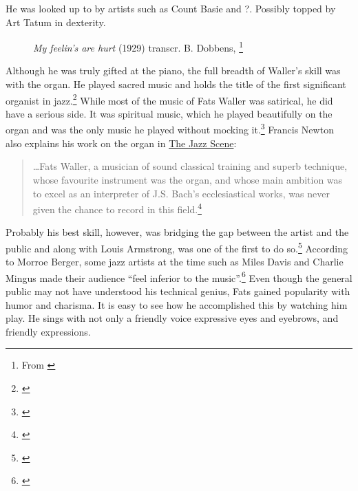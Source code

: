 \documentclass[11pt]{report}
\begin{document}
	
	
	
	He was looked up to by artists such as Count Basie and ?.
	Possibly topped by Art Tatum in dexterity.



	\begin{figure}[ht]
		\centering
		\begin{minipage}{\textwidth}

			{%
\parindent 0pt
\ifx\preLilyPondExample \undefined
\else
  \expandafter\preLilyPondExample
\fi
\def\lilypondbook{}%

\ifx\postLilyPondExample \undefined
\else
  \expandafter\postLilyPondExample
\fi
}


		\caption{\emph{My feelin's are hurt} (1929) transcr. B. Dobbens,  \protect\footnote{\scriptsize From \cite[]{grove-book:waller}}}
		\label{fig:hurt}
		
		\end{minipage}
	\end{figure}


	\label{sec:oregon}
	Although he was truly gifted at the piano, the full breadth of Waller's skill was with the organ. He played sacred music and holds the title of the first significant organist in jazz.\footnote{\cite[40]{grove-book:waller}} While most of the music of Fats Waller was satirical, he did have a serious side. It was spiritual music, which he played beautifully on the organ and was the only music he played without mocking it.\footnote{\cite[8]{outside-insider}} Francis Newton also explains his work on the organ in \underline{The Jazz Scene}:
	\begin{quote}
		\ldots Fats Waller, a musician of sound classical training and superb technique, whose favourite instrument was the organ, and whose main ambition was to excel as an interpreter of J.S. Bach's ecclesiastical works, was never given the chance to record in this field.\footnote{\cite[209]{jazz_scene}}
	\end{quote}

	\label{sec:charisma}
	Probably his best skill, however, was bridging the gap between the artist and the public and along with Louis Armstrong, was one of the first to do so.\footnote{\cite[3]{life}} According to Morroe Berger, some jazz artists at the time such as Miles Davis and Charlie Mingus made their audience ``feel inferior to the music''.\footnote{\cite[16]{outside-insider}} Even though the general public may not have understood his technical genius, Fats gained popularity with humor and charisma. It is easy to see how he accomplished this by watching him play. He sings with not only a friendly voice expressive eyes and eyebrows, and friendly expressions.
	
\end{document}
